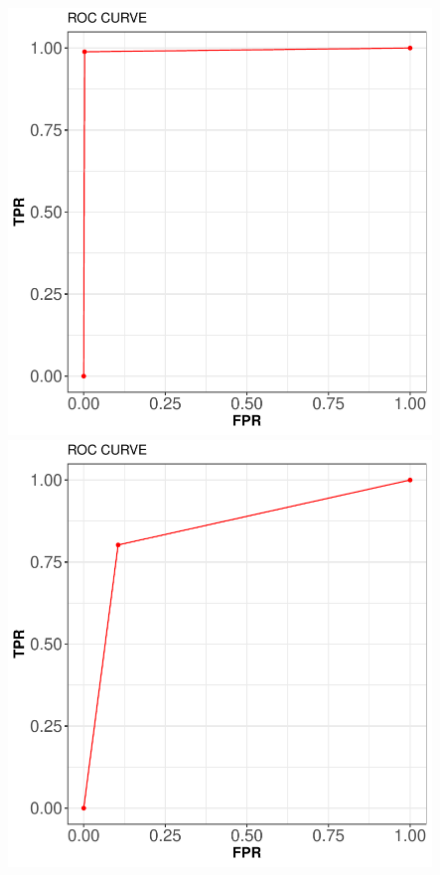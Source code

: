 \documentclass[12pt,%
               a4paper,%
               oneside,openany,%
               titlepage,%
               headinclude,footinclude,%
               BCOR5mm,%
               cleardoublepage=empty,%
               tablecaptionabove,%
               floatperchapter,
               ]{scrreprt}                 %
\begin{document}
  
  \begin{figure}[ht]
  \begin{minipage}[b]{0.5\linewidth}
    \centering
    \includegraphics[width=.9\linewidth]{Figures/ROC_RF.pdf}
    \vspace{4ex}
  \end{minipage} 
  \begin{minipage}[b]{0.5\linewidth}
    \centering
    \includegraphics[width=.9\linewidth]{Figures/ROC_SVM.pdf}

\end{minipage}
\end{figure}
\end{document}
